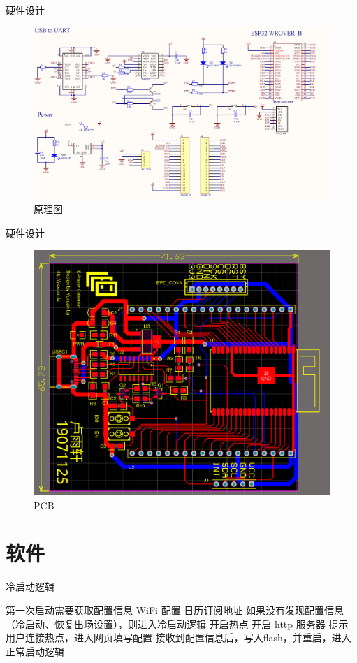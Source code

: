 \documentclass{ctexbeamer}
\begin{document}
\begin{frame}{硬件设计}
    \begin{figure}[htp]
      \centering
      \includegraphics[width=\linewidth]{image5.png}
      \caption{原理图}
    \end{figure}
\end{frame}

\begin{frame}{硬件设计}
    \begin{figure}[htp]
      \centering
      \includegraphics[width=.8\linewidth]{image6.png}
      \caption{PCB}
    \end{figure}
\end{frame}

\section{软件}

\begin{frame}{冷启动逻辑}
    \begin{outline}
        \1 第一次启动需要获取配置信息
            \2 WiFi 配置
            \2 日历订阅地址
        \1 如果没有发现配置信息（冷启动、恢复出场设置），则进入冷启动逻辑
            \2 开启热点
            \2 开启 http 服务器
            \2 提示用户连接热点，进入网页填写配置
        \1 接收到配置信息后，写入flash，并重启，进入正常启动逻辑
    \end{outline}
\end{frame}
\end{document}
